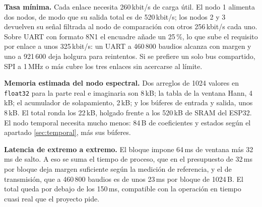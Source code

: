 \textbf{Tasa mínima.} Cada enlace necesita 260\,kbit/s de carga útil. El nodo 1
alimenta dos nodos, de modo que su salida total es de 520\,kbit/s; los nodos 2 y
3 devuelven su señal filtrada al nodo de comparación con otros 256\,kbit/s cada
uno. Sobre UART con formato 8N1 el encuadre añade un 25\,\%, lo que sube el
requisito por enlace a unos 325\,kbit/s: un UART a 460\,800 baudios alcanza con
margen y uno a 921\,600 deja holgura para reintentos. Si se prefiere un solo bus
compartido, SPI a 1\,MHz o más cubre los tres enlaces sin acercarse al límite.

\textbf{Memoria estimada del nodo espectral.} Dos arreglos de 1024 valores en
\texttt{float32} para la parte real e imaginaria son 8\,kB; la tabla de la
ventana Hann, 4\,kB; el acumulador de solapamiento, 2\,kB; y los búferes de
entrada y salida, unos 8\,kB. El total ronda los 22\,kB, holgado frente a los
520\,kB de SRAM del ESP32. El nodo temporal necesita mucho menos: 84\,B de
coeficientes y estados según el apartado \ref{sec:temporal}, más sus búferes.

\textbf{Latencia de extremo a extremo.} El bloque impone 64\,ms de ventana más
32\,ms de salto. A eso se suma el tiempo de proceso, que en el presupuesto de
32\,ms por bloque deja margen suficiente según la medición de referencia, y el de
transmisión, que a 460\,800 baudios es de unos 23\,ms por bloque de 1024\,B. El
total queda por debajo de los 150\,ms, compatible con la operación en tiempo
cuasi real que el proyecto pide.
